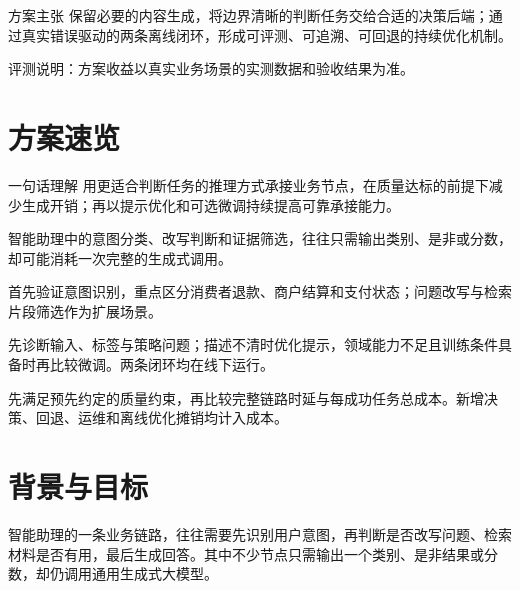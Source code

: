 \documentclass[UTF8,a4paper,11pt,fontset=windows]{ctexart}
\begin{document}
\begin{titlepage}
\begin{center}
\end{center}
\vspace{17mm}
\begin{insight}{方案主张}
保留必要的内容生成，将边界清晰的判断任务交给合适的决策后端；通过真实错误驱动的两条离线闭环，形成可评测、可追溯、可回退的持续优化机制。
\end{insight}
\vfill
{\small\color{Muted}评测说明：方案收益以真实业务场景的实测数据和验收结果为准。}
\end{titlepage}
\section*{方案速览}
\begin{insight}{一句话理解}
用更适合判断任务的推理方式承接业务节点，在质量达标的前提下减少生成开销；再以提示优化和可选微调持续提高可靠承接能力。
\end{insight}
\begin{description}[style=nextline,leftmargin=2em,labelwidth=2em]
\item[为什么做] 智能助理中的意图分类、改写判断和证据筛选，往往只需输出类别、是非或分数，却可能消耗一次完整的生成式调用。
\item[从哪里开始] 首先验证意图识别，重点区分消费者退款、商户结算和支付状态；问题改写与检索片段筛选作为扩展场景。
\item[如何持续改进] 先诊断输入、标签与策略问题；描述不清时优化提示，领域能力不足且训练条件具备时再比较微调。两条闭环均在线下运行。
\item[怎样判断有效] 先满足预先约定的质量约束，再比较完整链路时延与每成功任务总成本。新增决策、回退、运维和离线优化摊销均计入成本。
\end{description}

\clearpage
\tableofcontents
\clearpage
{}


\section{背景与目标}

智能助理的一条业务链路，往往需要先识别用户意图，再判断是否改写问题、检索材料是否有用，最后生成回答。其中不少节点只需输出一个类别、是非结果或分数，却仍调用通用生成式大模型。
\end{document}
